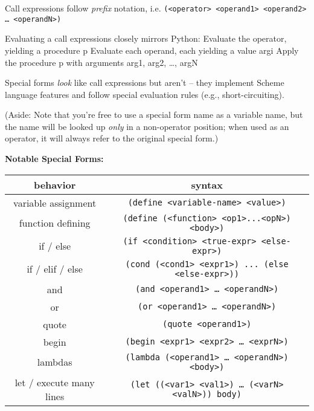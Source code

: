 Call expressions follow \textit{prefix} notation, i.e.
\texttt{(<operator> <operand1> <operand2> … <operandN>)}

Evaluating a call expressions closely mirrors Python:
Evaluate the operator, yielding a procedure p
Evaluate each operand, each yielding a value argi
Apply the procedure p with arguments arg1, arg2, …, argN

Special forms \textit{look} like call expressions but aren’t -- they implement Scheme language features and follow special evaluation rules (e.g., short-circuiting). 

(Aside: Note that you’re free to use a special form name as a variable name, but the name will be looked up \textit{only} in a non-operator position; when used as an operator, it will always refer to the original special form.)

\textbf{Notable Special Forms:}
\begin{center}
\begin{tabular}{ |c|c| }
    \hline
    behavior & syntax \\
    \hline
    variable assignment   & \texttt{(define <variable-name> <value>)} \\
    \hline
    function defining & \texttt{(define (<function> <op1>...<opN>) <body>)} \\
    \hline
    if / else & \texttt{(if <condition> <true-expr> <else-expr>)} \\
    \hline
    if / elif / else & \texttt{(cond (<cond1> <expr1>) ... (else <else-expr>))} \\
    \hline
    and & \texttt{(and <operand1> … <operandN>)} \\
    \hline
    or & \texttt{(or <operand1> … <operandN>)} \\
    \hline
    quote & \texttt{(quote <operand1>)} \\
    \hline
    begin & \texttt{(begin <expr1> <expr2> … <exprN>)} \\
    \hline
    lambdas & \texttt{(lambda (<operand1> … <operandN>) <body>)} \\
    \hline
    let / execute many lines & \texttt{(let ((<var1> <val1>) … (<varN> <valN>)) body)} \\
    \hline
\end{tabular}
\end{center}